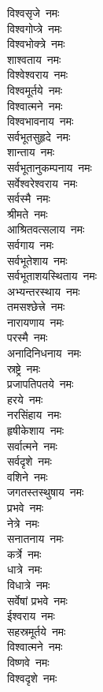 \begin{multicols}{2}
\begin{flushleft}
विश्वसृजे~नमः\\
विश्वगोप्त्रे~नमः\\
विश्वभोक्त्रे~नमः\\
शाश्वताय~नमः\hfill{}\\
विश्वेश्वराय~नमः\\
विश्वमूर्तये~नमः\\
विश्वात्मने~नमः\\
विश्वभावनाय~नमः\\
सर्वभूतसुहृदे~नमः\\
शान्ताय~नमः\\
सर्वभूतानुकम्पनाय~नमः\\
सर्वेश्वरेश्वराय~नमः\\
सर्वस्मै~नमः\\
श्रीमते~नमः\hfill{}\\
आश्रितवत्सलाय~नमः\\
सर्वगाय~नमः\\
सर्वभूतेशाय~नमः\\
सर्वभूताशयस्थिताय~नमः\\
अभ्यन्तरस्थाय~नमः\\
तमसश्छेत्त्रे~नमः\\
नारायणाय~नमः\\
परस्मै~नमः\\
अनादिनिधनाय~नमः\\
स्रष्ट्रे~नमः\hfill{}\\
प्रजापतिपतये~नमः\\
हरये~नमः\\
नरसिंहाय~नमः\\
हृषीकेशाय~नमः\\
सर्वात्मने~नमः\\
सर्वदृशे~नमः\\
वशिने~नमः\\
जगतस्तस्थुषाय~नमः\\
प्रभवे~नमः\\
नेत्रे~नमः\hfill{}\\
सनातनाय~नमः\\
कर्त्रे~नमः\\
धात्रे~नमः\\
विधात्रे~नमः\\
सर्वेषां प्रभवे~नमः\\
ईश्वराय~नमः\\
सहस्रमूर्तये~नमः\\
विश्वात्मने~नमः\\
विष्णवे~नमः\\
विश्वदृशे~नमः\hfill{}\\

\end{flushleft}
\end{multicols}

